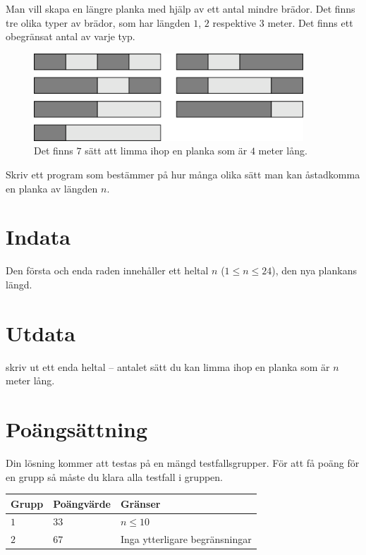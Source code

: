 Man vill skapa en längre planka med hjälp av ett antal mindre brädor.
Det finns tre olika typer av brädor, som har längden $1$, $2$ respektive $3$ meter.
Det finns ett obegränsat antal av varje typ.

\begin{figure}[h!]
    \centering
    \includegraphics[width=0.9\textwidth]{plank.png}
    \caption{Det finns $7$ sätt att limma ihop en planka som är $4$ meter lång. }
\end{figure}

Skriv ett program som bestämmer på hur många olika sätt man kan åstadkomma en planka av längden $n$.

\section*{Indata}
Den första och enda raden innehåller ett heltal $n$ ($1 \le n \le 24$), den nya plankans längd.

\section*{Utdata}
skriv ut ett enda heltal -- antalet sätt du kan limma ihop en planka som är $n$ meter lång.

\section*{Poängsättning}
Din lösning kommer att testas på en mängd testfallsgrupper.
För att få poäng för en grupp så måste du klara alla testfall i gruppen.

\noindent
\begin{tabular}{| l | l | l |}
  \hline
  Grupp & Poängvärde & Gränser \\ \hline
  $1$    & $33$        &  $n \le 10$ \\ \hline
  $2$    & $67$        &  Inga ytterligare begränsningar \\ \hline
\end{tabular}
